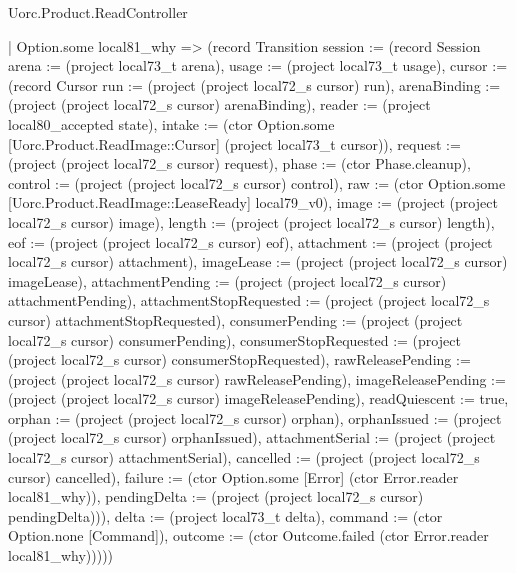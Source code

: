 \begin{lexlean}{Uorc.Product.ReadController}
\begin{semanticmodule}
{      | Option.some local81_why => (record Transition {session := (record Session {arena := (project local73_t arena), usage := (project local73_t usage), cursor := (record Cursor {run := (project (project local72_s cursor) run), arenaBinding := (project (project local72_s cursor) arenaBinding), reader := (project local80_accepted state), intake := (ctor Option.some [Uorc.Product.ReadImage::Cursor] (project local73_t cursor)), request := (project (project local72_s cursor) request), phase := (ctor Phase.cleanup), control := (project (project local72_s cursor) control), raw := (ctor Option.some [Uorc.Product.ReadImage::LeaseReady] local79_v0), image := (project (project local72_s cursor) image), length := (project (project local72_s cursor) length), eof := (project (project local72_s cursor) eof), attachment := (project (project local72_s cursor) attachment), imageLease := (project (project local72_s cursor) imageLease), attachmentPending := (project (project local72_s cursor) attachmentPending), attachmentStopRequested := (project (project local72_s cursor) attachmentStopRequested), consumerPending := (project (project local72_s cursor) consumerPending), consumerStopRequested := (project (project local72_s cursor) consumerStopRequested), rawReleasePending := (project (project local72_s cursor) rawReleasePending), imageReleasePending := (project (project local72_s cursor) imageReleasePending), readQuiescent := true, orphan := (project (project local72_s cursor) orphan), orphanIssued := (project (project local72_s cursor) orphanIssued), attachmentSerial := (project (project local72_s cursor) attachmentSerial), cancelled := (project (project local72_s cursor) cancelled), failure := (ctor Option.some [Error] (ctor Error.reader local81_why)), pendingDelta := (project (project local72_s cursor) pendingDelta)})}), delta := (project local73_t delta), command := (ctor Option.none [Command]), outcome := (ctor Outcome.failed (ctor Error.reader local81_why))})))
}
\end{semanticmodule}
\end{lexlean}

